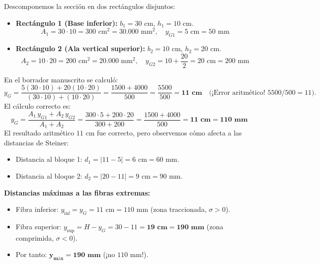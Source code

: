 
Descomponemos la sección en dos rectángulos disjuntos:
\begin{itemize}
    \item \textbf{Rectángulo 1 (Base inferior):} $b_1 = 30\text{ cm}$, $h_1 = 10\text{ cm}$.
          \[
              A_1 = 30 \cdot 10 = 300\text{ cm}^2 = 30.000\text{ mm}^2, \quad y_{G1} = 5\text{ cm} = 50\text{ mm}
          \]
    \item \textbf{Rectángulo 2 (Ala vertical superior):} $b_2 = 10\text{ cm}$, $h_2 = 20\text{ cm}$.
          \[
              A_2 = 10 \cdot 20 = 200\text{ cm}^2 = 20.000\text{ mm}^2, \quad y_{G2} = 10 + \frac{20}{2} = 20\text{ cm} = 200\text{ mm}
          \]
\end{itemize}

\begin{tcolorbox}[colback=yellow!10!white,colframe=orange!80!black,title=\textbf{Aclaración Rigurosa: Corrección del Centro de Gravedad $y_G$}]
    En el borrador manuscrito se calculó:
    \[
        y_G = \frac{5(30 \cdot 10) + 20(10 \cdot 20)}{(30 \cdot 10) + (10 \cdot 20)} = \frac{1500 + 4000}{500} = \frac{5500}{500} = \mathbf{11\text{ cm}} \quad \text{(¡Error aritmético! $5500 / 500 = 11$)}.
    \]
    El cálculo correcto es:
    \begin{equation}
        y_G = \frac{A_1 \, y_{G1} + A_2 \, y_{G2}}{A_1 + A_2} = \frac{300 \cdot 5 + 200 \cdot 20}{300 + 200} = \frac{1500 + 4000}{500} = \mathbf{11\text{ cm} = 110\text{ mm}}
    \end{equation}
    El resultado aritmético $11\text{ cm}$ fue correcto, pero observemos cómo afecta a las distancias de Steiner:
    \begin{itemize}
        \item Distancia al bloque 1: $d_1 = |11 - 5| = 6\text{ cm} = 60\text{ mm}$.
        \item Distancia al bloque 2: $d_2 = |20 - 11| = 9\text{ cm} = 90\text{ mm}$.
    \end{itemize}
    \textbf{Distancias máximas a las fibras extremas:}
    \begin{itemize}
        \item Fibra inferior: $y_{\text{inf}} = y_G = 11\text{ cm} = 110\text{ mm}$ (zona traccionada, $\sigma > 0$).
        \item Fibra superior: $y_{\text{sup}} = H - y_G = 30 - 11 = \mathbf{19\text{ cm} = 190\text{ mm}}$ (zona comprimida, $\sigma < 0$).
        \item Por tanto: $\mathbf{y_{\text{máx}} = 190\text{ mm}}$ (¡no $110\text{ mm}$!).
    \end{itemize}
\end{tcolorbox}

